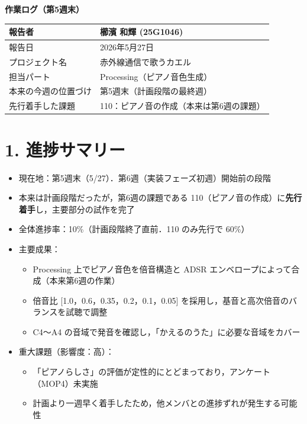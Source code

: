 \documentclass[a4paper,11pt]{ltjsarticle}
\providecommand{\％}{\%}
\begin{document}
\begin{center}
    {\LARGE \textbf{作業ログ（第5週末）}}\\[1em]
\end{center}

\begin{tabular}{|p{4cm}|p{10cm}|}
\hline
報告者 & 櫛濱 和輝 (25G1046)\\
\hline
報告日 & 2026年5月27日\\
\hline
プロジェクト名 & 赤外線通信で歌うカエル\\
\hline
担当パート & Processing（ピアノ音色生成）\\
\hline
本来の今週の位置づけ & 第5週末（計画段階の最終週）\\
\hline
先行着手した課題 & 110：ピアノ音の作成（本来は第6週の課題）\\
\hline
\end{tabular}

\vspace{1em}

\section{1. 進捗サマリー}

\begin{itemize}
    \item 現在地：第5週末（5/27）．第6週（実装フェーズ初週）開始前の段階
    \item 本来は計画段階だったが，第6週の課題である 110（ピアノ音の作成）に\textbf{先行着手}し，主要部分の試作を完了
    \item 全体進捗率：10\％（計画段階終了直前．110 のみ先行で 60\％）
    \item 主要成果：
    \begin{itemize}
        \item Processing 上でピアノ音色を倍音構造と ADSR エンベロープによって合成（本来第6週の作業）
        \item 倍音比 [1.0，0.6，0.35，0.2，0.1，0.05] を採用し，基音と高次倍音のバランスを試聴で調整
        \item C4〜A4 の音域で発音を確認し，「かえるのうた」に必要な音域をカバー
    \end{itemize}
    \item 重大課題（影響度：高）：
    \begin{itemize}
        \item 「ピアノらしさ」の評価が定性的にとどまっており，アンケート（MOP4）未実施
        \item 計画より一週早く着手したため，他メンバとの進捗ずれが発生する可能性
    \end{itemize}
\end{itemize}
\end{document}
